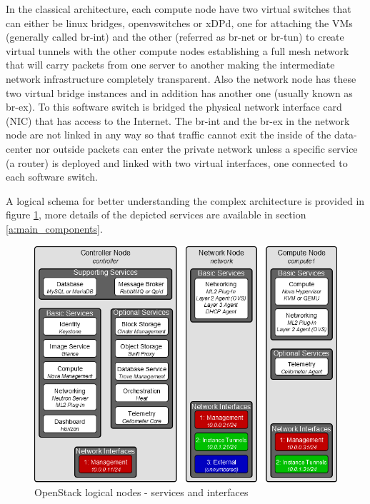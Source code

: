 \label{a:br_section}
In the classical architecture, each compute node have two virtual switches that can either be linux bridges, openvswitches\cite{ovswebsite} or xDPd\cite{xdpdwebsite}, one for attaching the VMs (generally called br-int) and the other (referred as br-net or br-tun) to create virtual tunnels with the other compute nodes establishing a full mesh network that will carry packets from one server to another making the intermediate network infrastructure completely transparent. Also the network node has these two virtual bridge instances and in addition has another one (usually known as br-ex). To this software switch is bridged the physical network interface card (NIC) that has access to the Internet.
The br-int and the br-ex in the network node are not linked in any way so that traffic cannot exit the inside of the data-center nor outside packets can enter the private network unless a specific service (a router) is deployed and linked with two virtual interfaces, one connected to each software switch.

A logical schema for better understanding the complex architecture is provided in figure  \ref{fig:OSarchitecture}, more details of the depicted services are available in section \ref{a:main_components}.
\begin{figure}[h]
	\centering
	\includegraphics[clip= true, width= \columnwidth]{images/openstack_nodes.png}
	\caption{OpenStack logical nodes - services and interfaces}
	\label{fig:OSarchitecture}
\end{figure}

